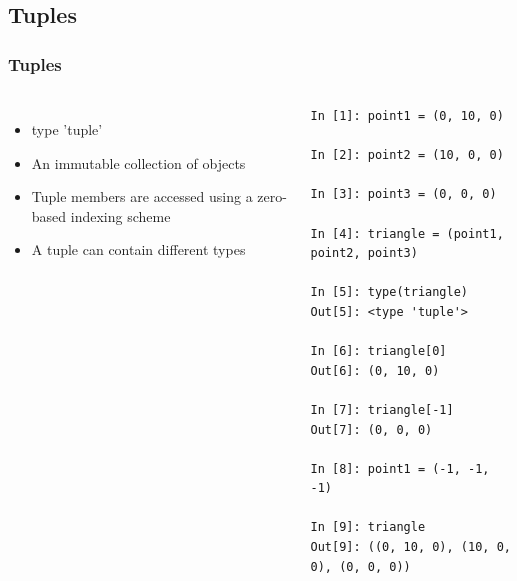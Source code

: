 \documentclass{beamer}
\begin{document}
\subsection{Tuples}
\begin{frame}[fragile]
\frametitle{Tuples}
\begin{columns}[c]
\column{2.5in}
\begin{itemize}
\item{type 'tuple'}
\item{An immutable collection of objects}
\item{Tuple members are accessed using a zero-based indexing scheme}
\item{A tuple can contain different types}
\end{itemize}

\column{2.5in}
\tiny
\begin{lstlisting}
In [1]: point1 = (0, 10, 0)

In [2]: point2 = (10, 0, 0)

In [3]: point3 = (0, 0, 0)

In [4]: triangle = (point1, point2, point3)

In [5]: type(triangle)
Out[5]: <type 'tuple'>

In [6]: triangle[0]
Out[6]: (0, 10, 0)

In [7]: triangle[-1]
Out[7]: (0, 0, 0)

In [8]: point1 = (-1, -1, -1)

In [9]: triangle
Out[9]: ((0, 10, 0), (10, 0, 0), (0, 0, 0))
\end{lstlisting}
\end{columns}
\end{frame}
\end{document}
